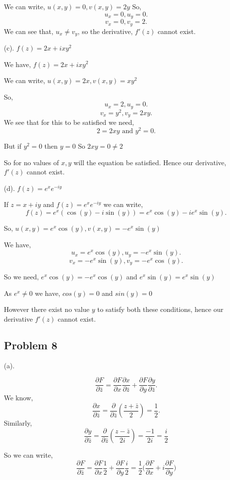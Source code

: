 \documentclass[a4paper]{report}
\begin{document}
We can write,  $u(x,y) = 0, v(x,y) =  2y$
So, 
 \[
    u_x = 0, u_y = 0
.\] 
\[
v_x = 0, v_y = 2
.\] 
We can see that, $u_x \neq v_y$, so the derivative, $f'(z)$ cannot exist.


(c). $f(z) = 2x + ixy^2$

We have, $f(z) = 2x + ixy^2$

We can write, $u(x,y) = 2x, v(x,y) = xy^2$

So, \[
u_x = 2, u_y = 0
.\]
\[
v_x = y^2, v_y = 2xy
.\] 
We see that for this to be satisfied we need, \[
    2 = 2xy \text{ and } y^2 = 0
.\] 

But if $y^2 = 0$ then $y = 0$ So  $2xy = 0 \neq 2$

So for no values of $x,y$ will the equation be satisfied. Hence our derivative,  $f'(z)$ cannot exist.

(d). $f(z) = e^x e^{-iy}$

If $z = x + iy$ and  $f(z) = e^x e^{-iy}$ we can write, \[
f(z) = e^x (\cos(y) - i\sin(y)) = e^x\cos(y) - ie^x\sin(y)
.\] 

So, $u(x,y) = e^x\cos(y), v(x,y) = -e^x\sin(y)$

We have, \[
u_x = e^x\cos(y), u_y = -e^x\sin(y)
.\] 
\[
v_x = -e^x\sin(y), v_y = -e^x\cos(y)
.\] 

So we need, $e^x\cos(y) = -e^x\cos(y)$ and $e^x\sin(y) = e^x\sin(y)$

As $e^x \neq 0$ we have, $cos(y) = 0$ and  $sin(y) = 0$

However there exist no value  $y$ to satisfy both these conditions, hence our derivative  $f'(z)$ cannot exist.


\subsection*{Problem 8}
(a).

\[
    \frac{\partial  F}{\partial \bar z} =    \frac{\partial  F}{\partial x}    \frac{\partial  x}{\partial \bar z}   +    \frac{\partial  F}{\partial y}  \frac{\partial  y}{\partial \bar z}
.\] 
We know, \[
\frac{\partial  x}{\partial \bar z}  = \frac{\partial }{\partial \bar z}  (\frac{z + \bar z}{2}) = \frac{1}{2}
.\] 
Similarly, 
\[
\frac{\partial  y}{\partial \bar z}  = \frac{\partial }{\partial \bar z}  (\frac{z - \bar z}{2i}) = \frac{-1}{2i} = \frac{i}{2}
\]

So we can write, \[
    \frac{\partial  F}{\partial \bar z} =    \frac{\partial  F}{\partial x}   \frac{1}{2}   +    \frac{\partial  F}{\partial y}  \frac{i}{2} = \frac{1}{2}\bigg(   \frac{\partial  F}{\partial x} + i  \frac{\partial  F}{\partial y} \bigg)
\]
\end{document}
